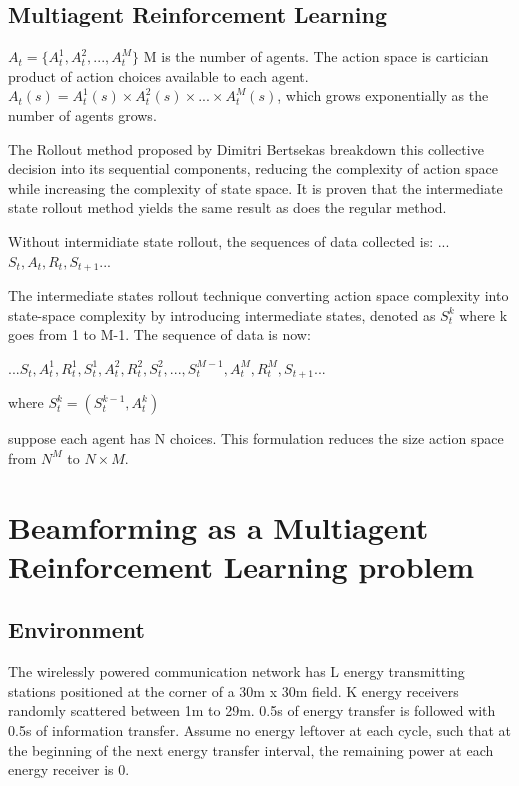 \subsection{Multiagent Reinforcement Learning}
$A_t=\{A_t^1,A_t^2,...,A_t^M\}$ M is the number of agents. The action space is cartician product of action choices available to each agent. $A_t(s)=A_t^1(s) \times A_t^2(s) \times ... \times A_t^M(s)$, which grows exponentially as the number of agents grows.

The Rollout method proposed by Dimitri Bertsekas breakdown this collective decision into its sequential components, reducing the complexity of action space while increasing the complexity of state space. It is proven that the intermediate state rollout method yields the same result as does the regular method. \cite{Bertsekas2019MultiagentRA}

Without intermidiate state rollout, the sequences of data collected is:
...$S_t, A_t, R_t, S_{t+1}$...

The intermediate states rollout technique converting action space complexity into state-space complexity by introducing intermediate states, denoted as $S_t^k$ where k goes from 1 to M-1. The sequence of data is now:

...$S_t,A_t^1,R_t^1,S_t^1,A_t^2,R_t^2, S_t^2, ... , S_t^{M-1},A_t^M,R_t^M,S_{t+1}$...

where $S_t^k=(S_t^{k-1},A_t^k)$

suppose each agent has N choices. This formulation reduces the size action space from $N^M$ to $N \times M$.


\section{Beamforming as a Multiagent Reinforcement Learning problem}
\subsection{Environment}
The wirelessly powered communication network has L energy transmitting stations positioned at the corner of a 30m x 30m field. K energy receivers randomly scattered between 1m to 29m. 0.5s of energy transfer is followed with 0.5s of information transfer. Assume no energy leftover at each cycle, such that at the beginning of the next energy transfer interval, the remaining power at each energy receiver is 0.

